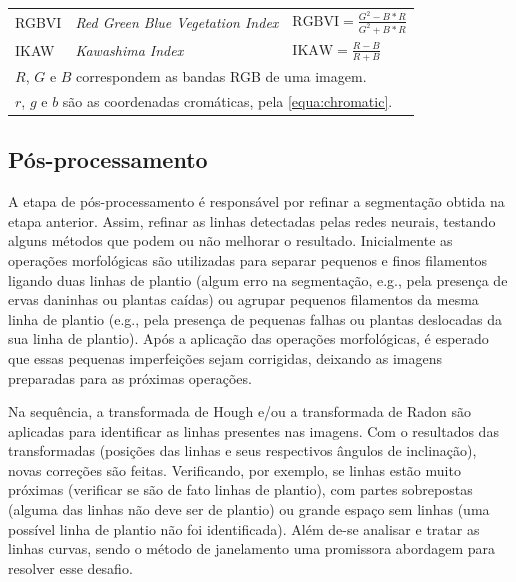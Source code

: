 \documentclass[12pt, a4paper, english, brazil]{article}
\begin{document}
\begin{table}[htb]
\begin{tabular}{@{}lll@{}}
        \multirow{2}{*}{RGBVI} & \multirow{2}{*}{\textit{Red Green Blue Vegetation Index}} & \multirow{2}{*}{$\displaystyle \text{RGBVI} = \frac{G^2 - B * R}{G^2 + B * R}$} \\
        & & \\ \midrule

        \multirow{2}{*}{IKAW} & \multirow{2}{*}{\textit{Kawashima Index}} & \multirow{2}{*}{$\displaystyle \text{IKAW} = \frac{R - B}{R + B}$} \\
        & & \\ \bottomrule

         \multicolumn{3}{l}{$R$, $G$ e $B$ correspondem as bandas RGB de uma imagem.} \\
         \multicolumn{3}{l}{$r$, $g$ e $b$ são as coordenadas cromáticas, pela \autoref{equa:chromatic}.} \\

    \end{tabular}
\end{table}

\subsection{Pós-processamento}

A etapa de pós-processamento é responsável por refinar a segmentação obtida na etapa anterior. Assim, refinar as linhas detectadas pelas redes neurais, testando alguns métodos que podem ou não melhorar o resultado. Inicialmente as operações morfológicas são utilizadas para separar pequenos e finos filamentos ligando duas linhas de plantio (algum erro na segmentação, e.g., pela presença de ervas daninhas ou plantas caídas) ou agrupar pequenos filamentos da mesma linha de plantio (e.g., pela presença de pequenas falhas ou plantas deslocadas da sua linha de plantio). Após a aplicação das operações morfológicas, é esperado que essas pequenas imperfeições sejam corrigidas, deixando as imagens preparadas para as próximas operações.

Na sequência, a transformada de Hough e/ou a transformada de Radon são aplicadas para identificar as linhas presentes nas imagens. Com o resultados das transformadas (posições das linhas e seus respectivos ângulos de inclinação), novas correções são feitas. Verificando, por exemplo, se linhas estão muito próximas (verificar se são de fato linhas de plantio), com partes sobrepostas (alguma das linhas não deve ser de plantio) ou grande espaço sem linhas (uma possível linha de plantio não foi identificada). Além de-se analisar e tratar as linhas curvas, sendo o método de janelamento uma promissora abordagem para resolver esse desafio.
\end{document}
